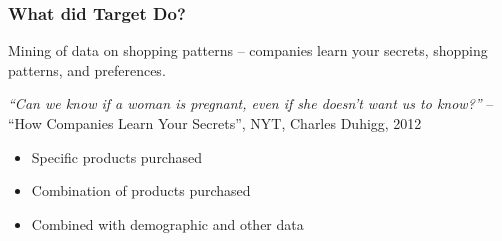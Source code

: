 

\begin{frame}[fragile]\frametitle{What did Target Do?}
Mining of data on shopping patterns -- companies learn your secrets, shopping patterns, and preferences.

{\em ``Can we know if a woman is pregnant, even if she doesn't want us to know?''} -- ``How Companies Learn Your Secrets'', NYT, Charles Duhigg, 2012

	\begin{itemize}
	\item Specific products purchased
	\item Combination of products purchased
	\item Combined with demographic and other data
	\end{itemize}
\end{frame}

